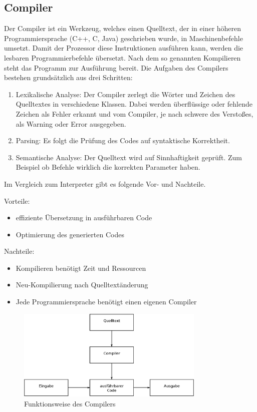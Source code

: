 \subsection{Compiler}\label{kap:compiler}

Der Compiler ist ein Werkzeug, welches einen Quelltext, der in einer höheren Programmiersprache (C++, C, Java) geschrieben wurde, in Maschinenbefehle umsetzt.
 Damit der Prozessor diese Instruktionen ausführen kann, werden die lesbaren Programmierbefehle übersetzt. Nach dem so genannten Kompilieren steht das Programm zur Ausführung bereit.
Die Aufgaben des Compilers bestehen grundsätzlich aus drei Schritten:\cite{compiler}
\begin{enumerate}
  \item Lexikalische Analyse:
  	Der Compiler zerlegt die Wörter und Zeichen des Quelltextes in verschiedene Klassen. Dabei werden überflüssige oder fehlende Zeichen als Fehler erkannt und vom Compiler, je nach
  schwere des Verstoßes, als Warning oder Error ausgegeben.
  \item Parsing:
  	Es folgt die Prüfung des Codes auf syntaktische Korrektheit.
  \item Semantische Analyse: Der Quelltext wird auf Sinnhaftigkeit geprüft. Zum Beispiel ob Befehle wirklich die korrekten Parameter haben.
\end{enumerate}

Im Vergleich zum Interpreter gibt es folgende Vor- und Nachteile.

Vorteile:
\begin{itemize}
  \item effiziente Übersetzung in ausführbaren Code
  \item Optimierung des generierten Codes
\end{itemize}

Nachteile:
\begin{itemize}
  \item Kompilieren benötigt Zeit und Ressourcen
  \item Neu-Kompilierung nach Quelltextänderung
  \item Jede Programmiersprache benötigt einen eigenen Compiler
\end{itemize}

\begin{figure}[H]
\centering
\includegraphics[width=0.8\textwidth]{Hauptteil/Compiler.eps}
\caption{Funktionsweise des Compilers}\label{fig:compiler}
\end{figure}

